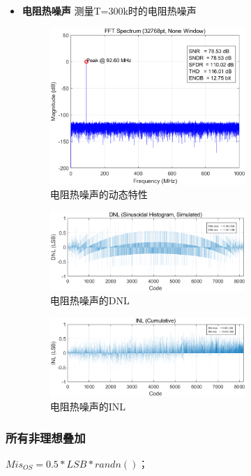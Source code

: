 \documentclass[cs4size,a4paper]{ctexart}
\numberwithin{equation}{section}
\numberwithin{table}{section}
\numberwithin{figure}{section}
\begin{document}
\begin{itemize}
		\item \textbf{电阻热噪声} 测量T=300k时的电阻热噪声
		\begin{figure}[H]
			\centering
			\includegraphics[width=0.7\textwidth]{pic/KT/DFT.png}
			\caption{电阻热噪声的动态特性} 
		\end{figure}

		\begin{figure}[H]
			\centering
			\includegraphics[width=0.7\textwidth]{pic/KT/DNL.png}
			\caption{电阻热噪声的DNL} 
		\end{figure}

		\begin{figure}[H]
			\centering
			\includegraphics[width=0.7\textwidth]{pic/KT/INL.png}
			\caption{电阻热噪声的INL} 
		\end{figure}
	\end{itemize}


\subsubsection{所有非理想叠加}
$Mis_{OS} = 0.5 * LSB * randn()$；
\end{document}
